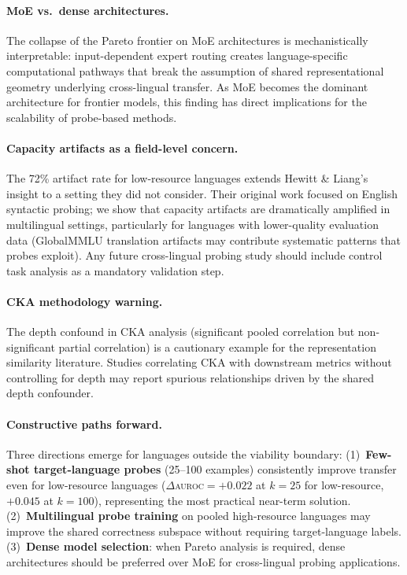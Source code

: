 \documentclass[11pt,a4paper]{article}
\newcommand{\auroc}{\textsc{auroc}}
\begin{document}
\paragraph{MoE vs.\ dense architectures.}
The collapse of the Pareto frontier on MoE architectures is mechanistically interpretable: input-dependent expert routing creates language-specific computational pathways that break the assumption of shared representational geometry underlying cross-lingual transfer.
As MoE becomes the dominant architecture for frontier models, this finding has direct implications for the scalability of probe-based methods.

\paragraph{Capacity artifacts as a field-level concern.}
The 72\% artifact rate for low-resource languages extends Hewitt \& Liang's \citeyear{hewitt2019designing} insight to a setting they did not consider.
Their original work focused on English syntactic probing; we show that capacity artifacts are dramatically amplified in multilingual settings, particularly for languages with lower-quality evaluation data (GlobalMMLU translation artifacts may contribute systematic patterns that probes exploit).
Any future cross-lingual probing study should include control task analysis as a mandatory validation step.

\paragraph{CKA methodology warning.}
The depth confound in CKA analysis (significant pooled correlation but non-significant partial correlation) is a cautionary example for the representation similarity literature.
Studies correlating CKA with downstream metrics without controlling for depth may report spurious relationships driven by the shared depth confounder.

\paragraph{Constructive paths forward.}
Three directions emerge for languages outside the viability boundary:
(1)~\textbf{Few-shot target-language probes} (25--100 examples) consistently improve transfer even for low-resource languages ($\Delta$\auroc{}$=+0.022$ at $k{=}25$ for low-resource, $+0.045$ at $k{=}100$), representing the most practical near-term solution.
(2)~\textbf{Multilingual probe training} on pooled high-resource languages may improve the shared correctness subspace without requiring target-language labels.
(3)~\textbf{Dense model selection}: when Pareto analysis is required, dense architectures should be preferred over MoE for cross-lingual probing applications.
\end{document}
